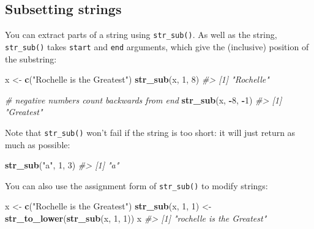 \documentclass[]{book}
\newenvironment{Shaded}{\begin{snugshade}}{\end{snugshade}}
\newcommand{\KeywordTok}[1]{\textcolor[rgb]{0.13,0.29,0.53}{\textbf{#1}}}
\newcommand{\DecValTok}[1]{\textcolor[rgb]{0.00,0.00,0.81}{#1}}
\newcommand{\StringTok}[1]{\textcolor[rgb]{0.31,0.60,0.02}{#1}}
\newcommand{\CommentTok}[1]{\textcolor[rgb]{0.56,0.35,0.01}{\textit{#1}}}
\newcommand{\OperatorTok}[1]{\textcolor[rgb]{0.81,0.36,0.00}{\textbf{#1}}}
\newcommand{\NormalTok}[1]{#1}
\begin{document}
\subsection{Subsetting strings}\label{subsetting-strings}

You can extract parts of a string using \texttt{str\_sub()}. As well as
the string, \texttt{str\_sub()} takes \texttt{start} and \texttt{end}
arguments, which give the (inclusive) position of the substring:

\begin{Shaded}
\begin{Highlighting}[]
\NormalTok{x <-}\StringTok{ }\KeywordTok{c}\NormalTok{(}\StringTok{"Rochelle is the Greatest"}\NormalTok{)}
\KeywordTok{str_sub}\NormalTok{(x, }\DecValTok{1}\NormalTok{, }\DecValTok{8}\NormalTok{)}
\CommentTok{#> [1] "Rochelle"}

\CommentTok{# negative numbers count backwards from end}
\KeywordTok{str_sub}\NormalTok{(x, }\OperatorTok{-}\DecValTok{8}\NormalTok{, }\OperatorTok{-}\DecValTok{1}\NormalTok{)}
\CommentTok{#> [1] "Greatest"}
\end{Highlighting}
\end{Shaded}

Note that \texttt{str\_sub()} won't fail if the string is too short: it
will just return as much as possible:

\begin{Shaded}
\begin{Highlighting}[]
\KeywordTok{str_sub}\NormalTok{(}\StringTok{"a"}\NormalTok{, }\DecValTok{1}\NormalTok{, }\DecValTok{3}\NormalTok{)}
\CommentTok{#> [1] "a"}
\end{Highlighting}
\end{Shaded}

You can also use the assignment form of \texttt{str\_sub()} to modify
strings:

\begin{Shaded}
\begin{Highlighting}[]
\NormalTok{x <-}\StringTok{ }\KeywordTok{c}\NormalTok{(}\StringTok{"Rochelle is the Greatest"}\NormalTok{)}
\KeywordTok{str_sub}\NormalTok{(x, }\DecValTok{1}\NormalTok{, }\DecValTok{1}\NormalTok{) <-}\StringTok{ }\KeywordTok{str_to_lower}\NormalTok{(}\KeywordTok{str_sub}\NormalTok{(x, }\DecValTok{1}\NormalTok{, }\DecValTok{1}\NormalTok{))}
\NormalTok{x}
\CommentTok{#> [1] "rochelle is the Greatest"}
\end{Highlighting}
\end{Shaded}
\end{document}
